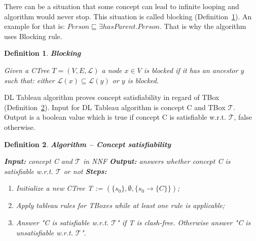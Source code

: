 \documentclass[12pt,a4paper]{article}
\newtheorem{definition}{Definition}[subsection]
\begin{document}
There can be a situation that some concept can lead to infinite looping and algorithm would never stop. This situation is called blocking (Definition~\ref{def:blocking}). An example for that is: $Person \sqsubseteq \exists hasParent.Person$. That is why the algorithm uses Blocking rule.

\begin{definition}{\textbf{Blocking}}
	\label{def:blocking}
	
	Given a CTree $T = (V, E, \mathcal{L})$ a node $x \in V$ is blocked if it has an ancestor $y$ such that: either $\mathcal{L}(x) \subseteq \mathcal{L}(y)$ or $y$ is blocked.
\end{definition}

DL Tableau algorithm proves concept satisfiability in regard of TBox (Definition~\ref{def:conceptSatisfiability}). Input for DL Tableau algorithm is concept C and TBox $\mathcal{T}$. Output is a boolean value which is true if concept C is satisfiable w.r.t. $\mathcal{T}$, false otherwise.

\begin{definition}{\textbf{Algorithm -- Concept satisfiability}}	
	\label{def:conceptSatisfiability}

	\textbf{Input:} concept C and $\mathcal{T}$ in NNF \newline
	\indent \textbf{Output:} answers whether concept C is satisfiable w.r.t. $\mathcal{T}$ or not \newline
	\indent \textbf{Steps:}
	\begin{enumerate}
		\item Initialize a new CTree T := $(\{s_{0}\}, \emptyset, \{s_{0} \rightarrow \{C\}\})$;
		\item Apply tableau rules for TBoxes while at least one rule is applicable;
		\item Answer "C is satisfiable w.r.t. $\mathcal{T}$" if T is clash-free. Otherwise answer "C is unsatisfiable w.r.t. $\mathcal{T}$".
	\end{enumerate}
\end{definition}
\end{document}
